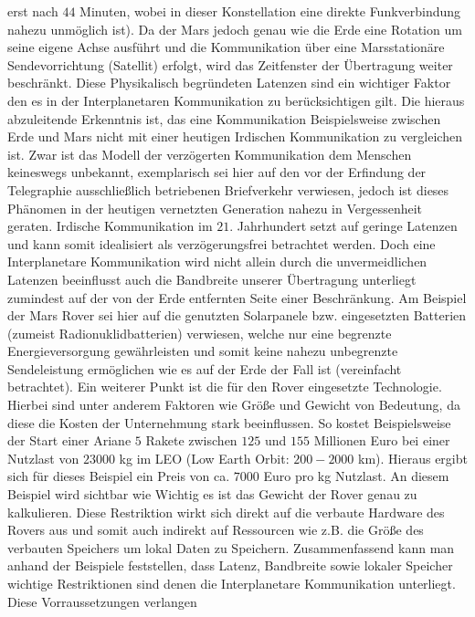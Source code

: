 erst nach $44$ Minuten, wobei in dieser Konstellation eine direkte
Funkverbindung nahezu unm{\"o}glich ist).
Da der Mars jedoch genau wie die Erde eine Rotation um seine eigene Achse ausf{\"u}hrt und die Kommunikation {\"u}ber eine
Marsstation{\"a}re Sendevorrichtung (Satellit) erfolgt, wird das Zeitfenster der
{\"U}bertragung weiter beschr{\"a}nkt. Diese Physikalisch begr{\"u}ndeten
Latenzen sind ein wichtiger Faktor den es in der Interplanetaren Kommunikation
zu ber{\"u}cksichtigen gilt. Die hieraus abzuleitende Erkenntnis ist, das eine
Kommunikation Beispielsweise zwischen Erde und Mars nicht mit einer heutigen
Irdischen Kommunikation zu vergleichen ist. Zwar ist das Modell der
verz{\"o}gerten Kommunikation dem Menschen keineswegs unbekannt, exemplarisch
sei hier auf den vor der Erfindung der Telegraphie ausschlie{\ss}lich
betriebenen Briefverkehr verwiesen, jedoch ist dieses Ph{\"a}nomen in der
heutigen vernetzten Generation nahezu in Vergessenheit geraten. Irdische
Kommunikation im $21$. Jahrhundert setzt auf geringe Latenzen und kann somit
idealisiert als verz{\"o}gerungsfrei betrachtet werden. Doch eine Interplanetare
Kommunikation wird nicht allein durch die unvermeidlichen Latenzen beeinflusst
auch die Bandbreite unserer {\"U}bertragung unterliegt zumindest auf der von der
Erde entfernten Seite einer Beschr{\"a}nkung. Am Beispiel der Mars Rover sei
hier auf die genutzten Solarpanele bzw. eingesetzten Batterien (zumeist
Radionuklidbatterien) verwiesen, welche nur eine begrenzte Energieversorgung
gew{\"a}hrleisten und somit keine nahezu unbegrenzte Sendeleistung 
erm{\"o}glichen wie es auf der Erde der Fall ist (vereinfacht betrachtet). 
Ein weiterer Punkt ist die f{\"u}r den Rover eingesetzte Technologie. Hierbei 
sind unter anderem Faktoren wie Gr{\"o}{\ss}e und Gewicht von Bedeutung, da 
diese die Kosten der Unternehmung stark beeinflussen. So kostet Beispielsweise 
der Start einer Ariane $5$ Rakete zwischen $125$ und $155$ Millionen Euro bei 
einer Nutzlast von $23000$ kg im LEO (Low Earth Orbit: $200-2000$ km). Hieraus 
ergibt sich f{\"u}r dieses Beispiel ein Preis von ca. $7000$ Euro pro kg 
Nutzlast. An diesem Beispiel wird sichtbar wie Wichtig es ist das Gewicht 
der Rover genau zu kalkulieren. Diese Restriktion wirkt sich direkt auf die 
verbaute Hardware des Rovers aus und somit auch indirekt auf Ressourcen wie 
z.B. die Gr{\"o}{\ss}e des verbauten Speichers um lokal Daten zu Speichern. 
Zusammenfassend kann man anhand der Beispiele feststellen, dass Latenz, 
Bandbreite sowie lokaler Speicher wichtige Restriktionen sind denen die 
Interplanetare Kommunikation unterliegt. Diese Vorraussetzungen verlangen 
